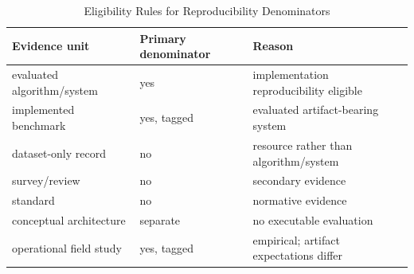 \begin{table}[H]\centering\caption{Eligibility Rules for Reproducibility Denominators}\label{tab:denominators}\scriptsize\begin{tabularx}{\columnwidth}{p{}p{}Y}\toprule Evidence unit & Primary denominator & Reason\\\midrule evaluated algorithm/system & yes & implementation reproducibility eligible\\ implemented benchmark & yes, tagged & evaluated artifact-bearing system\\ dataset-only record & no & resource rather than algorithm/system\\ survey/review & no & secondary evidence\\ standard & no & normative evidence\\ conceptual architecture & separate & no executable evaluation\\ operational field study & yes, tagged & empirical; artifact expectations differ\\\bottomrule\end{tabularx}\end{table}